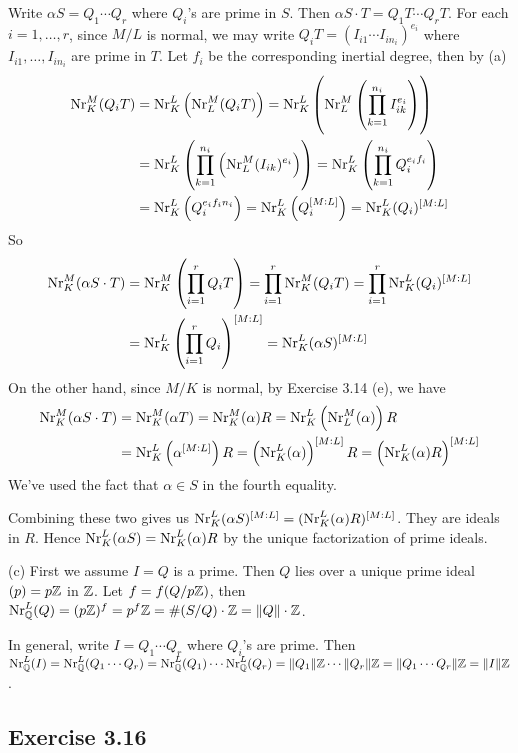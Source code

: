 \documentclass[../Marcus.tex]{subfiles}
\begin{document}
Write $\alpha S=Q_1\cdots Q_r$ where $Q_i$'s are prime in $S$. Then $\alpha S\cdot T=Q_1T\cdots Q_rT$. For each $i=1,\ldots,r$, since $M/L$ is normal, we may write $Q_iT=(I_{i1}\cdots I_{in_i})^{e_i}$ where $I_{i1},\ldots,I_{in_i}$ are prime in $T$. Let $f_i$ be the corresponding inertial degree, then by (a)
\begin{align*}
    \operatorname{Nr}^M_K(Q_iT) &= \operatorname{Nr}^L_K\left(\operatorname{Nr}^M_L(Q_iT)\right) = \operatorname{Nr}^L_K\left(\operatorname{Nr}^M_L\left(\prod_{k=1}^{n_i} I_{ik}^{e_i}\right)\right) \\
    &= \operatorname{Nr}^L_K\left(\prod_{k=1}^{n_i}\left(\operatorname{Nr}^M_L (I_{ik})^{e_i}\right)\right) = \operatorname{Nr}^L_K\left(\prod_{k=1}^{n_i} Q_i^{e_if_i}\right) \\
    &= \operatorname{Nr}^L_K\left(Q_i^{e_if_in_i}\right) = \operatorname{Nr}^L_K\left(Q_i^{[M:L]}\right) = \operatorname{Nr}^L_K(Q_i)^{[M:L]}
\end{align*}
So
\begin{align*}
    \operatorname{Nr}^M_K(\alpha S\cdot T) &= \operatorname{Nr}^M_K\left(\prod_{i=1}^r Q_iT\right) = \prod_{i=1}^r \operatorname{Nr}^M_K(Q_iT) = \prod_{i=1}^r \operatorname{Nr}^L_K(Q_i)^{[M:L]} \\
    &= \operatorname{Nr}^L_K\left(\prod_{i=1}^r Q_i\right)^{[M:L]} = \operatorname{Nr}^L_K(\alpha S)^{[M:L]}
\end{align*}
On the other hand, since $M/K$ is normal, by Exercise 3.14 (e), we have
\begin{align*}
    \operatorname{Nr}^M_K(\alpha S\cdot T) &= \operatorname{Nr}^M_K(\alpha T) = \operatorname{Nr}^M_K(\alpha)R = \operatorname{Nr}^L_K\left(\operatorname{Nr}^M_L(\alpha)\right)R \\
    &= \operatorname{Nr}^L_K\left(\alpha^{[M:L]}\right)R = \left(\operatorname{Nr}^L_K(\alpha)\right)^{[M:L]}R = \left(\operatorname{Nr}^L_K(\alpha)R\right)^{[M:L]} 
\end{align*}
We've used the fact that $\alpha\in S$ in the fourth equality.

Combining these two gives us $\operatorname{Nr}^L_K(\alpha S)^{[M:L]}=(\operatorname{Nr}^L_K(\alpha)R)^{[M:L]}$. They are ideals in $R$. Hence $\operatorname{Nr}^L_K(\alpha S)=\operatorname{Nr}^L_K(\alpha)R$ by the unique factorization of prime ideals.

(c) First we assume $I=Q$ is a prime. Then $Q$ lies over a unique prime ideal $(p)=p\mathbb{Z}$ in $\mathbb{Z}$. Let $f=f(Q/p\mathbb{Z})$, then $\operatorname{Nr}^L_{\mathbb{Q}}(Q)=(p\mathbb{Z})^f=p^f\mathbb{Z}=\#(S/Q)\cdot\mathbb{Z}=\|Q\|\cdot\mathbb{Z}$.

In general, write $I=Q_1\cdots Q_r$ where $Q_i$'s are prime. Then $\operatorname{Nr}^L_{\mathbb{Q}}(I)=\operatorname{Nr}^L_{\mathbb{Q}}(Q_1\cdots Q_r)=\operatorname{Nr}^L_{\mathbb{Q}}(Q_1)\cdots\operatorname{Nr}^L_{\mathbb{Q}}(Q_r)=\|Q_1\|\mathbb{Z}\cdots\|Q_r\|\mathbb{Z}=\|Q_1\cdots Q_r\|\mathbb{Z}=\|I\|\mathbb{Z}$.

\subsection*{Exercise 3.16}
\end{document}
